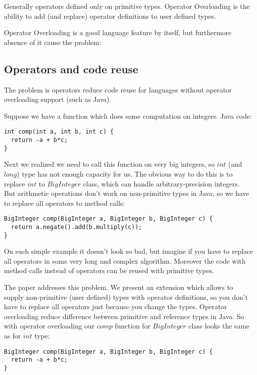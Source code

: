 \documentclass{aircc}
\begin{document}
Generally operators defined only on primitive types.
Operator Overloading is the ability to add (and replace) operator definitions to user defined types.

Operator Overloading is a good language feature by itself,
but furthermore absence of it cause the problem:

\subsection{Operators and code reuse \label{codereuse}}
The problem is operators reduce code reuse for languages without operator overloading support (such as Java).

Suppose we have a function which does some computation on integers. Java code:
\begin{lstlisting}
int comp(int a, int b, int c) {
  return -a + b*c;
}
\end{lstlisting}
Next we realized we need to call this function on very big integers, so $int$ (and $long$) type has not enough capacity for us.
The obvious way to do this is to replace $int$ to $BigInteger$ class, which can handle arbitrary-precision integers.
But arithmetic operations don't work on non-primitive types in Java,
so we have to replace all operators to method calls:
\begin{lstlisting}
BigInteger comp(BigInteger a, BigInteger b, BigInteger c) {
  return a.negate().add(b.multiply(c));
}
\end{lstlisting}
On such simple example it doesn't look so bad, but imagine if you have to replace all operators in some very long and complex algorithm.
Moreover the code with method calls instead of operators can be reused with primitive types.

The paper addresses this problem. We present an extension which allows to supply non-primitive (user defined) types
with operator definitions, so you don't have to replace all operators just because you change the types.
Operator overloading reduce difference between primitive and reference types in Java.
So with operator overloading our $comp$ function for $BigInteger$ class looks the same as for $int$ type:
\begin{lstlisting}
BigInteger comp(BigInteger a, BigInteger b, BigInteger c) {
  return -a + b*c;
}
\end{lstlisting}
\end{document}

